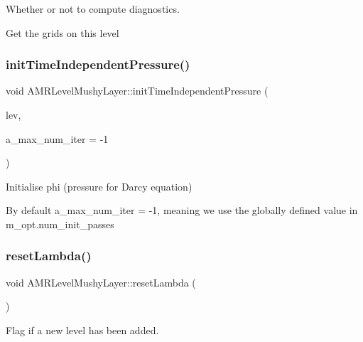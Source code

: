Whether or not to compute diagnostics. 

Get the grids on this level \mbox{\label{class_a_m_r_level_mushy_layer_abc11317ec5dd18433dc83b3ab2aaf959}} 
\subsubsection{\texorpdfstring{init\+Time\+Independent\+Pressure()}{initTimeIndependentPressure()}}
{\footnotesize\ttfamily void A\+M\+R\+Level\+Mushy\+Layer\+::init\+Time\+Independent\+Pressure (\begin{DoxyParamCaption}\item[{\hyperlink{class_a_m_r_level_mushy_layer}{A\+M\+R\+Level\+Mushy\+Layer} $\ast$}]{lev,  }\item[{int}]{a\+\_\+max\+\_\+num\+\_\+iter = {\ttfamily -\/1} }\end{DoxyParamCaption})\hspace{0.3cm}{\ttfamily [protected]}}



Initialise phi (pressure for Darcy equation) 

By default a\+\_\+max\+\_\+num\+\_\+iter = -\/1, meaning we use the globally defined value in m\+\_\+opt.\+num\+\_\+init\+\_\+passes \mbox{\label{class_a_m_r_level_mushy_layer_a28479bc8ab69c855a8d79628cddd5b28}} 
\subsubsection{\texorpdfstring{reset\+Lambda()}{resetLambda()}}
{\footnotesize\ttfamily void A\+M\+R\+Level\+Mushy\+Layer\+::reset\+Lambda (\begin{DoxyParamCaption}{ }\end{DoxyParamCaption})\hspace{0.3cm}{\ttfamily [protected]}}



Flag if a new level has been added. 

